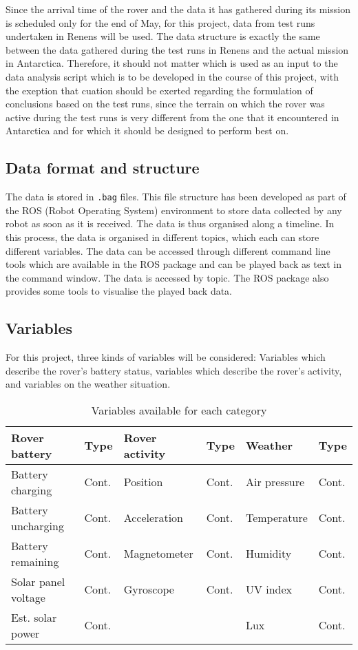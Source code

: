 \documentclass[11pt, UKenglish]{report}
\begin{document}
{Since the arrival time of the rover and the data it has gathered during its mission is scheduled only for the end of May, for this project, data from test runs undertaken in Renens will be used. The data structure is exactly the same between the data gathered during the test runs in Renens and the actual mission in Antarctica. Therefore, it should not matter which is used as an input to the data analysis script which is to be developed in the course of this project, with the exeption that cuation should be exerted regarding the formulation of conclusions based on the test runs, since the terrain on which the rover was active during the test runs is very different from the one that it encountered in Antarctica and for which it should be designed to perform best on. 

\subsection*{Data format and structure}

The data is stored in \texttt{.bag} files. This file structure has been developed as part of the ROS (Robot Operating System) environment to store data collected by any robot as soon as it is received. The data is thus organised along a timeline. In this process, the data is organised in different topics, which each can store different variables. The data can be accessed through different command line tools which are available in the ROS package and can be played back as text in the command window. The data is accessed by topic. The ROS package also provides some tools to visualise the played back data.

\subsection*{Variables}

For this project, three kinds of variables will be considered: Variables which describe the rover's battery status, variables which describe the rover's activity, and variables on the weather situation. 

\begin{table}[h]
\centering\captionsetup{font=footnotesize}	
\caption{Variables available for each category}
\label{tabdimension}
\begin{tabularx}{0.85\textwidth}{@{} l l | l l | l l @{}}
 \toprule
 Rover battery & Type & Rover activity & Type & Weather & Type \\  
 \midrule
 Battery charging & Cont. & Position & Cont. & Air pressure & Cont. \\ 
 Battery uncharging & Cont. & Acceleration & Cont. & Temperature & Cont. \\
 Battery remaining & Cont. & Magnetometer & Cont. & Humidity & Cont. \\
 Solar panel voltage & Cont. & Gyroscope & Cont. & UV index & Cont. \\
 Est. solar power & Cont. & & & Lux & Cont. \\ 
 \bottomrule
\end{tabularx}
\end{table}

}
\end{document}
